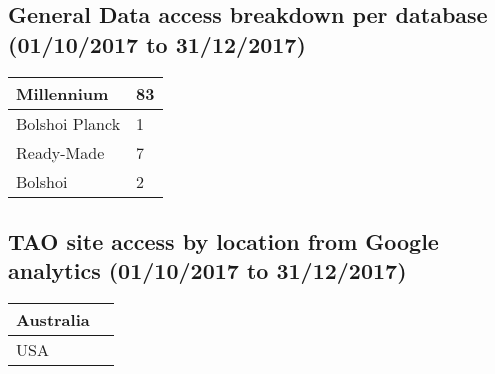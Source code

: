 \documentclass{article}%
\begin{document}
\subsection{General Data access breakdown per database (01/10/2017 to 31/12/2017)}%

%
\begin{longtabu}{X[l] X[l]}%
Millennium&83\\%
\hline%
Bolshoi Planck&1\\%
\hline%
Ready{-}Made&7\\%
\hline%
Bolshoi&2\\%
\hline%
\end{longtabu}%
\subsection{TAO site access by location from Google analytics (01/10/2017 to 31/12/2017)}%

%
\begin{longtabu}{X[l] X[l]}%
Australia&\\%
\hline%
USA&\\%
\hline%
\end{longtabu}%
\end{document}
